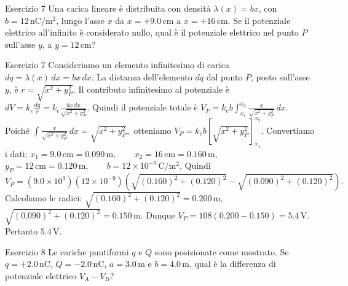 \documentclass[a4paper]{article}
\begin{document}
\begin{snippetexercise}{Esercizio 7}
    Una carica lineare è distribuita con densità
    \(\lambda(x) = bx\), con \(b = 12\,\mathrm{nC/m^2}\), lungo l'asse \(x\)
    da \(x = +9.0\,\mathrm{cm}\) a \(x = +16\,\mathrm{cm}\). Se il potenziale
    elettrico all'infinito è considerato nullo, qual è il potenziale elettrico
    nel punto \(P\) sull'asse \(y\), a \(y = 12\,\mathrm{cm}\)?

\end{snippetexercise}
\begin{snippetsolution}{Esercizio 7}
    Consideriamo un elemento infinitesimo di carica
    \(dq = \lambda(x)\,dx = bx\,dx.\)
    La distanza dell'elemento \(dq\) dal punto \(P\), posto sull'asse \(y\), è
    \(r = \sqrt{x^2 + y_P^2}.\)
    Il contributo infinitesimo al potenziale è
    \(dV = k_e\frac{dq}{r} = k_e \frac{bx\,dx}{\sqrt{x^2 + y_P^2}}.\)
    Quindi il potenziale totale è
    \(V_P = k_e b \int_{x_1}^{x_2} \frac{x}{\sqrt{x^2 + y_P^2}}\,dx.\)
    Poiché
    \(\int \frac{x}{\sqrt{x^2 + y_P^2}}\,dx = \sqrt{x^2 + y_P^2},\)
    otteniamo
    \(V_P = k_e b \left[ \sqrt{x^2 + y_P^2} \right]_{x_1}^{x_2}.\)
    Convertiamo i dati:
    \(x_1 = 9.0\,\mathrm{cm} = 0.090\,\mathrm{m}, \qquad x_2 = 16\,\mathrm{cm} = 0.160\,\mathrm{m},\)
    \(y_P = 12\,\mathrm{cm} = 0.120\,\mathrm{m}, \qquad b = 12 \times 10^{-9}\,\mathrm{C/m^2}.\)
    Quindi
    \[
        V_P =
        \left(9.0 \times 10^9\right)
        \left(12 \times 10^{-9}\right)
        \left(
            \sqrt{(0.160)^2 + (0.120)^2}
            -
            \sqrt{(0.090)^2 + (0.120)^2}
        \right).
    \]
    Calcoliamo le radici:
    \(\sqrt{(0.160)^2 + (0.120)^2} = 0.200\,\mathrm{m},\)
    \(\sqrt{(0.090)^2 + (0.120)^2} = 0.150\,\mathrm{m}.\)
    Dunque
    \(V_P = 108(0.200 - 0.150) = 5.4\,\mathrm{V}.\)
    Pertanto
    \(\boxed{5.4\,\mathrm{V}}.\)
\end{snippetsolution}
\begin{snippetexercise}{Esercizio 8}
    Le cariche puntiformi \(q\) e \(Q\) sono posizionate come mostrato. Se
    \(q = +2.0\,\mathrm{nC}\), \(Q = -2.0\,\mathrm{nC}\),
    \(a = 3.0\,\mathrm{m}\) e \(b = 4.0\,\mathrm{m}\), qual è la differenza di
    potenziale elettrico \(V_A - V_B\)?

\end{snippetexercise}
\end{document}
